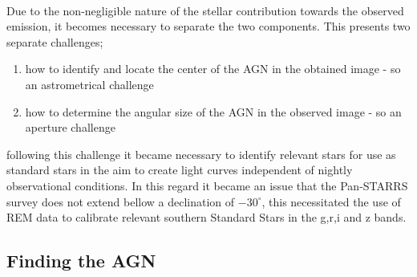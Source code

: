 \documentclass[a4paper, 12pt, twoside]{article}
\begin{document}
\\
Due to the non-negligible nature of the stellar contribution towards the observed emission, it becomes necessary to separate the two components. This presents two separate challenges;
\begin{enumerate}
\item how to identify and locate the center of the AGN in the obtained image - so an astrometrical challenge
\item how to determine the angular size of the AGN in the observed image - so an aperture challenge
\end{enumerate}
following this challenge it became necessary to identify relevant stars for use as standard stars in the aim to create light curves independent of nightly observational conditions. In this regard it became an issue that the Pan-STARRS survey does not extend bellow a declination of $-30^\circ$, this necessitated the use of REM data to calibrate relevant southern Standard Stars in the g,r,i and z bands. 

\subsection{Finding the AGN}
\end{document}
